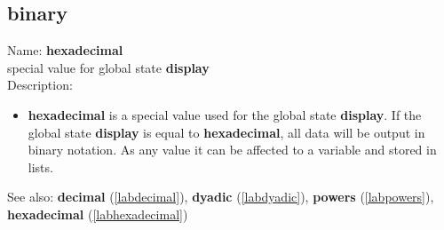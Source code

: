 \subsection{binary}
\label{labbinary}
\noindent Name: \textbf{hexadecimal}\\
special value for global state \textbf{display}\\

\noindent Description: \begin{itemize}

\item \textbf{hexadecimal} is a special value used for the global state \textbf{display}.  If
   the global state \textbf{display} is equal to \textbf{hexadecimal}, all data will be
   output in binary notation.
   As any value it can be affected to a variable and stored in lists.
\end{itemize}
See also: \textbf{decimal} (\ref{labdecimal}), \textbf{dyadic} (\ref{labdyadic}), \textbf{powers} (\ref{labpowers}), \textbf{hexadecimal} (\ref{labhexadecimal})
